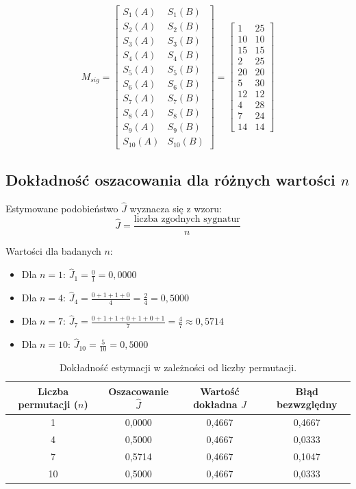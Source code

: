 \documentclass[12pt,a4paper]{article}
\begin{document}
\begin{equation}
M_{sig} = \begin{bmatrix}
S_1(A) & S_1(B) \\
S_2(A) & S_2(B) \\
S_3(A) & S_3(B) \\
S_4(A) & S_4(B) \\
S_5(A) & S_5(B) \\
S_6(A) & S_6(B) \\
S_7(A) & S_7(B) \\
S_8(A) & S_8(B) \\
S_9(A) & S_9(B) \\
S_{10}(A) & S_{10}(B)
\end{bmatrix}
=
\begin{bmatrix}
1 & 25 \\
10 & 10 \\
15 & 15 \\
2 & 25 \\
20 & 20 \\
5 & 30 \\
12 & 12 \\
4 & 28 \\
7 & 24 \\
14 & 14
\end{bmatrix}
\end{equation}

\subsection{Dokładność oszacowania dla różnych wartości $n$}

Estymowane podobieństwo $\hat{J}$ wyznacza się z wzoru:
\begin{equation}
\hat{J} = \frac{\text{liczba zgodnych sygnatur}}{n}
\end{equation}

Wartości dla badanych $n$:
\begin{itemize}
    \item Dla $n=1$: $\hat{J}_1 = \frac{0}{1} = 0,0000$
    \item Dla $n=4$: $\hat{J}_4 = \frac{0 + 1 + 1 + 0}{4} = \frac{2}{4} = 0,5000$
    \item Dla $n=7$: $\hat{J}_7 = \frac{0 + 1 + 1 + 0 + 1 + 0 + 1}{7} = \frac{4}{7} \approx 0,5714$
    \item Dla $n=10$: $\hat{J}_{10} = \frac{5}{10} = 0,5000$
\end{itemize}

\begin{table}[h!]
\centering
\caption{Dokładność estymacji w zależności od liczby permutacji.}
\label{tab:estimates}
\begin{tabular}{@{}cccc@{}}
\toprule
Liczba permutacji ($n$) & Oszacowanie $\hat{J}$ & Wartość dokładna $J$ & Błąd bezwzględny \\ \midrule
1  & 0,0000 & 0,4667 & 0,4667 \\
4  & 0,5000 & 0,4667 & 0,0333 \\
7  & 0,5714 & 0,4667 & 0,1047 \\
10 & 0,5000 & 0,4667 & 0,0333 \\ \bottomrule
\end{tabular}
\end{table}
\end{document}

